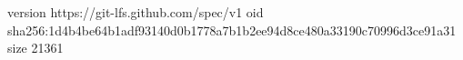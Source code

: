 version https://git-lfs.github.com/spec/v1
oid sha256:1d4b4be64b1adf93140d0b1778a7b1b2ee94d8ce480a33190c70996d3ce91a31
size 21361
